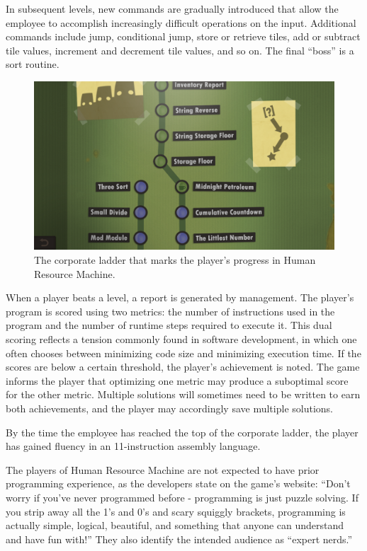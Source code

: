 \documentclass{sig-alternate-05-2015}
\begin{document}
In subsequent levels, new commands are gradually introduced that allow the employee to accomplish increasingly difficult operations on the input. Additional commands include jump, conditional jump, store or retrieve tiles, add or subtract tile values, increment and decrement tile values, and so on. The final ``boss'' is a sort routine.\begin{figure}[tb]
\centering
\includegraphics[width=\linewidth]{images/image08.png}
\caption{The corporate ladder that marks the player's progress in Human Resource Machine.}
\label{figure:hrmladder}
\end{figure}




When a player beats a level, a report is generated by management. The player's program is scored using two metrics: the number of instructions used in the program and the number of runtime steps required to execute it. This dual scoring reflects a tension commonly found in software development, in which one often chooses between minimizing code size and minimizing execution time. If the scores are below a certain threshold, the player's achievement is noted. The game informs the player that optimizing one metric may produce a suboptimal score for the other metric. Multiple solutions will sometimes need to be written to earn both achievements, and the player may accordingly save multiple solutions.



By the time the employee has reached the top of the corporate ladder, the player has gained fluency in an 11-instruction assembly language.



The players of Human Resource Machine are not expected to have prior programming experience, as the developers state on the game's website: ``Don't worry if you've never programmed before - programming is just puzzle solving. If you strip away all the 1's and 0's and scary squiggly brackets, programming is actually simple, logical, beautiful, and something that anyone can understand and have fun with!'' They also identify the intended audience as ``expert nerds.'' 
\end{document}
